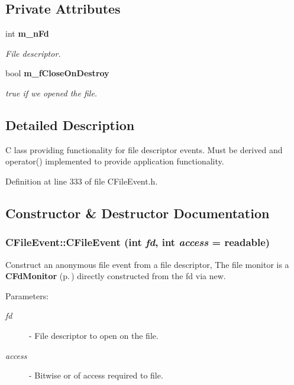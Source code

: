 \subsection*{Private Attributes}
\begin{CompactItemize}
\item 
int {\bf m\_\-n\-Fd}
\begin{CompactList}\small\item\em File descriptor.\item\end{CompactList}\item 
bool {\bf m\_\-f\-Close\-On\-Destroy}
\begin{CompactList}\small\item\em true if we opened the file.\item\end{CompactList}\end{CompactItemize}


\subsection{Detailed Description}
C lass providing functionality for  file descriptor events. Must be derived and  operator() implemented to provide application functionality. 



Definition at line 333 of file CFile\-Event.h.

\subsection{Constructor \& Destructor Documentation}
\subsubsection{\setlength{\rightskip}{0pt plus 5cm}CFile\-Event::CFile\-Event (int {\em fd}, int {\em access} = {\bf readable})}\label{classCFileEvent_a0}


Construct an anonymous file event from a file descriptor,  The file monitor is a {\bf CFd\-Monitor} {\rm (p.\,\pageref{classCFdMonitor})} directly constructed from the fd via new. \begin{Desc}
\item[Parameters: ]\par
\begin{description}
\item[{\em 
fd}]- File descriptor to open on the file. \item[{\em 
access}]- Bitwise or of access required to file. \end{description}
\end{Desc}


